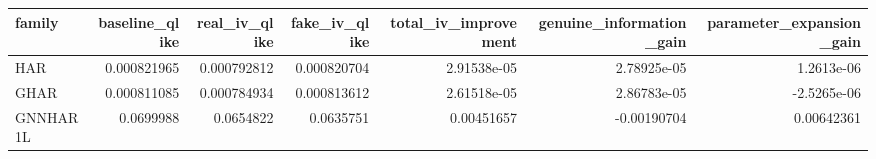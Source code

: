 \begin{tabular}{lrrrrrr}
\toprule
family & baseline_qlike & real_iv_qlike & fake_iv_qlike & total_iv_improvement & genuine_information_gain & parameter_expansion_gain \\
\midrule
HAR & 0.000821965 & 0.000792812 & 0.000820704 & 2.91538e-05 & 2.78925e-05 & 1.2613e-06 \\
GHAR & 0.000811085 & 0.000784934 & 0.000813612 & 2.61518e-05 & 2.86783e-05 & -2.5265e-06 \\
GNNHAR1L & 0.0699988 & 0.0654822 & 0.0635751 & 0.00451657 & -0.00190704 & 0.00642361 \\
\bottomrule
\end{tabular}
